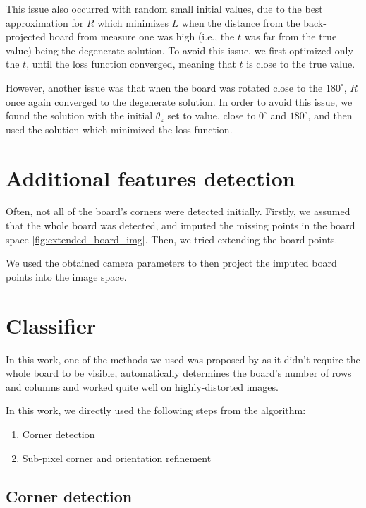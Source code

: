 This issue also occurred with random small initial values, due to the best
approximation for \(R\) which minimizes \(L\) when the distance from the
back-projected board from measure one was high (i.e., the \(t\) was far from
the true value) being the degenerate solution. To avoid this issue, we first optimized only the \(t\),
until the loss function converged, meaning that \(t\) is close to the true
value.

However, another issue was that when the board was rotated close to the
\(180^{\circ}\), \(R\) once again converged to the degenerate solution. In order
to avoid this issue, we found the solution with the initial \(\theta_z\) set to
value, close to \(0^{\circ}\) and \(180^{\circ}\), and then used the solution
which minimized the loss function.

\section{Additional features detection}\label{sec:additional_features_detection}

Often, not all of the board's corners were detected initially. Firstly, we
assumed that the whole board was detected, and imputed the missing points in the
board space \cref{fig:extended_board_img}. Then, we tried extending the board
points.

We used the obtained camera parameters to then project the imputed board points
into the image space.

\section{Classifier}\label{sec:classifier}

In this work, one of the methods we used was proposed by
\cite{geigerAutomaticCameraRange2012} as it didn't require the whole board to be
visible, automatically determines the board's number of rows and columns and
worked quite well on highly-distorted images.

In this work, we directly used the following steps from the algorithm:
\begin{enumerate}
	\item Corner detection
	\item Sub-pixel corner and orientation refinement
\end{enumerate}

\subsection{Corner detection}\label{sub:corner_detection}

